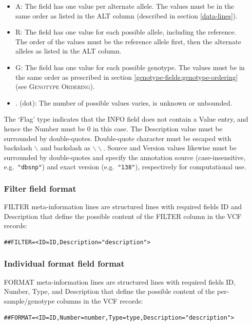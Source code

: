 \documentclass[8pt]{article}
\begin{document}
\begin{itemize}
  \item A: The field has one value per alternate allele.
  The values must be in the same order as listed in the ALT column (described in section \ref{data-lines}).
  \item R: The field has one value for each possible allele, including the reference.
  The order of the values must be the reference allele first, then the alternate alleles as listed in the ALT column.
  \item G: The field has one value for each possible genotype.
  The values must be in the same order as prescribed in section \ref{genotype-fields:genotype-ordering} (see \textsc{Genotype Ordering}).
  \item . (dot): The number of possible values varies, is unknown or unbounded.
\end{itemize}

The `Flag' type indicates that the INFO field does not contain a Value entry, and hence the Number must be $0$ in this case.
The Description value must be surrounded by double-quotes.
Double-quote character must be escaped with backslash $\backslash$ and backslash as $\backslash\backslash$.
Source and Version values likewise must be surrounded by double-quotes and specify the annotation source (case-insensitive, e.g.\ \verb|"dbsnp"|) and exact version (e.g.\ \verb|"138"|), respectively for computational use.

\subsubsection{Filter field format}
FILTER meta-information lines are structured lines with required fields ID and Description that define the possible content of the FILTER column in the VCF records:

\begin{verbatim}
##FILTER=<ID=ID,Description="description">
\end{verbatim}

\subsubsection{Individual format field format}
FORMAT meta-information lines are structured lines with required fields ID, Number, Type, and Description that define the possible content of the per-sample/genotype columns in the VCF records:

\begin{verbatim}
##FORMAT=<ID=ID,Number=number,Type=type,Description="description">
\end{verbatim}
\end{document}
